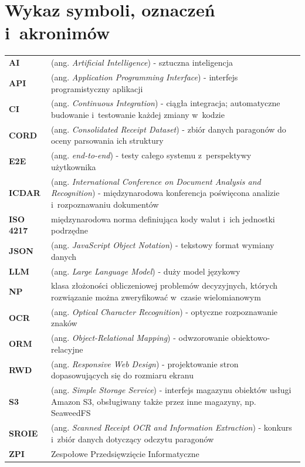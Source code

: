 \section{Wykaz symboli, oznaczeń i~akronimów}

\begin{longtable}{@{}>{\bfseries}p{}p{}@{}}
  AI & (ang. \emph{Artificial Intelligence}) - sztuczna inteligencja \\
  API & (ang. \emph{Application Programming Interface}) - interfejs programistyczny aplikacji \\
  CI & (ang. \emph{Continuous Integration}) - ciągła integracja; automatyczne budowanie i~testowanie każdej zmiany w~kodzie \\
  CORD & (ang. \emph{Consolidated Receipt Dataset}) - zbiór danych paragonów do oceny parsowania ich struktury \\
  E2E & (ang. \emph{end-to-end}) - testy całego systemu z~perspektywy użytkownika \\
  ICDAR & (ang. \emph{International Conference on Document Analysis and Recognition}) - międzynarodowa konferencja poświęcona analizie i~rozpoznawaniu dokumentów \\
  ISO 4217 & międzynarodowa norma definiująca kody walut i~ich jednostki podrzędne \\
  JSON & (ang. \emph{JavaScript Object Notation}) - tekstowy format wymiany danych \\
  LLM & (ang. \emph{Large Language Model}) - duży model językowy \\
  NP & klasa złożoności obliczeniowej problemów decyzyjnych, których rozwiązanie można zweryfikować w~czasie wielomianowym \\
  OCR & (ang. \emph{Optical Character Recognition}) - optyczne rozpoznawanie znaków \\
  ORM & (ang. \emph{Object-Relational Mapping}) - odwzorowanie obiektowo-relacyjne \\
  RWD & (ang. \emph{Responsive Web Design}) - projektowanie stron dopasowujących się do rozmiaru ekranu \\
  S3 & (ang. \emph{Simple Storage Service}) - interfejs magazynu obiektów usługi Amazon S3, obsługiwany także przez inne magazyny, np. SeaweedFS \\
  SROIE & (ang. \emph{Scanned Receipt OCR and Information Extraction}) - konkurs i~zbiór danych dotyczący odczytu paragonów \\
  ZPI & Zespołowe Przedsięwzięcie Informatyczne \\
\end{longtable}
